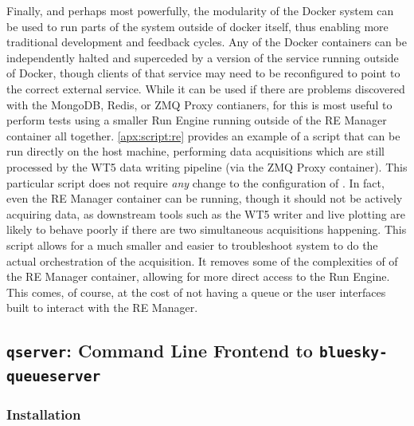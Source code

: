 Finally, and perhaps most powerfully, the modularity of the Docker system can be used to run parts of the system outside of docker itself, thus enabling more traditional development and feedback cycles.
Any of the Docker containers can be independently halted and superceded by a version of the service running outside of Docker, though clients of that service may need to be reconfigured to point to the correct external service.
While it can be used if there are problems discovered with the MongoDB, Redis, or ZMQ Proxy contianers, for \biab this is most useful to perform tests using a smaller Run Engine running outside of the RE Manager container all together.
\ref{apx:script:re} provides an example of a script that can be run directly on the host machine, performing data acquisitions which are still processed by the WT5 data writing pipeline (via the ZMQ Proxy container).
This particular script does not require \textit{any} change to the configuration of \biab.
In fact, even the RE Manager container can be running, though it should not be actively acquiring data, as downstream tools such as the WT5 writer and live plotting are likely to behave poorly if there are two simultaneous acquisitions happening.
This script allows for a much smaller and easier to troubleshoot system to do the actual orchestration of the acquisition.
It removes some of the complexities of of the RE Manager container, allowing for more direct access to the Run Engine.
This comes, of course, at the cost of not having a queue or the user interfaces built to interact with the RE Manager.







\subsection{\texttt{qserver}: Command Line Frontend to \texttt{bluesky-queueserver}}


\subsubsection{Installation}

